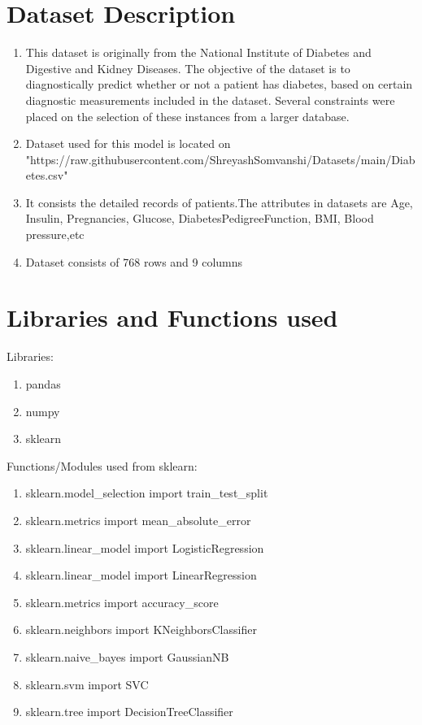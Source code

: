 \documentclass[pdftex,a4paper,11pt,oneside,openright]{report}
\begin{document}
\chapter{Dataset Description}
\begin{enumerate}
    \item This dataset is originally from the National Institute of Diabetes and Digestive and Kidney Diseases. The objective of the dataset is to diagnostically predict whether or not a patient has diabetes, based on certain diagnostic measurements included in the dataset. Several constraints were placed on the selection of these instances from a larger database.
    \item Dataset used for this model is located on "https://raw.githubusercontent.com/ShreyashSomvanshi/Datasets/main/Diabetes.csv" 
    \item It consists the detailed records of patients.The attributes in datasets are Age, Insulin, Pregnancies, Glucose, DiabetesPedigreeFunction, BMI, Blood pressure,etc
    \item Dataset consists of 768 rows and 9 columns
    
    
\end{enumerate}

\chapter{Libraries and Functions used}
\Large{Libraries: }
\Large{
\begin{enumerate}
    \item pandas
    \item numpy
    \item sklearn
\end{enumerate}
\Large{Functions/Modules used from sklearn: }
\begin{enumerate}
    \item sklearn.model\_selection import train\_test\_split
    \item sklearn.metrics import mean\_absolute\_error
    \item sklearn.linear\_model import LogisticRegression
    \item sklearn.linear\_model import LinearRegression
    \item sklearn.metrics import accuracy\_score
    \item sklearn.neighbors import KNeighborsClassifier
    \item sklearn.naive\_bayes import GaussianNB
    \item sklearn.svm import SVC
    \item sklearn.tree import DecisionTreeClassifier
\end{enumerate}
}
\end{document}
